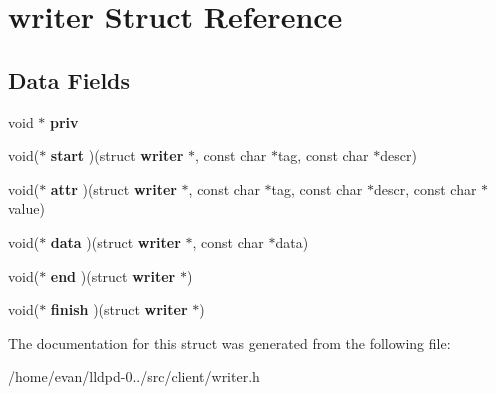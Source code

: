 \section{writer \-Struct \-Reference}
\label{structwriter}
\subsection*{\-Data \-Fields}
\begin{DoxyCompactItemize}
\item 
void $\ast$ {\bfseries priv}\label{structwriter_a8b6505c37d4ff95854b8b00527e4d9fa}

\item 
void($\ast$ {\bfseries start} )(struct {\bf writer} $\ast$, const char $\ast$tag, const char $\ast$descr)\label{structwriter_a7f060f9bf41204b3e73e2454df6a4bd8}

\item 
void($\ast$ {\bfseries attr} )(struct {\bf writer} $\ast$, const char $\ast$tag, const char $\ast$descr, const char $\ast$value)\label{structwriter_aeee4bc27e85e8c43a2233029e26c31ab}

\item 
void($\ast$ {\bfseries data} )(struct {\bf writer} $\ast$, const char $\ast$data)\label{structwriter_adfc8a23591e04e332e78abd5b904be3a}

\item 
void($\ast$ {\bfseries end} )(struct {\bf writer} $\ast$)\label{structwriter_a18d1122b3f6d4e302ae6c2b83dfe1769}

\item 
void($\ast$ {\bfseries finish} )(struct {\bf writer} $\ast$)\label{structwriter_ae26a8ef9d652738b57bede4c2b1c9c96}

\end{DoxyCompactItemize}


\-The documentation for this struct was generated from the following file\-:\begin{DoxyCompactItemize}
\item 
/home/evan/lldpd-\/0../src/client/writer.\-h\end{DoxyCompactItemize}

